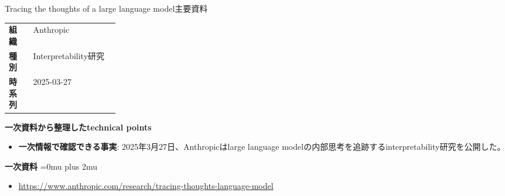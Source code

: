 \begin{technicalnote}{Tracing the thoughts of a large language model}{主要資料}
\begingroup
\begin{tabularx}{\linewidth}{@{}>{\bfseries}p{0.22\linewidth}X@{}}
組織 & Anthropic \\
種別 & Interpretability研究 \\
時系列 & 2025-03-27 \\
\end{tabularx}
\smallskip
\begin{minipage}{\linewidth}
{\bfseries 一次資料から整理したtechnical points}
\begin{itemize}[leftmargin=1.5em,itemsep=0.35em]
\item \textbf{一次情報で確認できる事実}: 2025年3月27日、Anthropicはlarge language modelの内部思考を追跡するinterpretability研究を公開した。
\end{itemize}
\begin{samepage}
{\bfseries 一次資料}
\begingroup\sloppy
\Urlmuskip=0mu plus 2mu\relax
\begin{itemize}[leftmargin=1.5em,itemsep=0.25em]
\item {\scriptsize\url{https://www.anthropic.com/research/tracing-thoughts-language-model}}
\end{itemize}
\endgroup
\end{samepage}
\end{minipage}
\endgroup
\end{technicalnote}
\medskip

